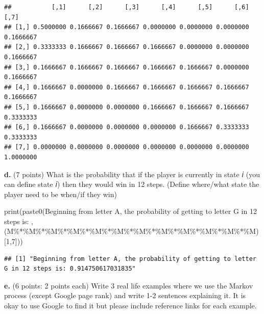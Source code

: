\documentclass[
]{article}
\newenvironment{Shaded}{\begin{snugshade}}{\end{snugshade}}
\newcommand{\DecValTok}[1]{\textcolor[rgb]{0.00,0.00,0.81}{#1}}
\newcommand{\FunctionTok}[1]{\textcolor[rgb]{0.00,0.00,0.00}{#1}}
\newcommand{\NormalTok}[1]{#1}
\newcommand{\SpecialCharTok}[1]{\textcolor[rgb]{0.00,0.00,0.00}{#1}}
\newcommand{\StringTok}[1]{\textcolor[rgb]{0.31,0.60,0.02}{#1}}
\begin{document}
\begin{verbatim}
##           [,1]      [,2]      [,3]      [,4]      [,5]      [,6]      [,7]
## [1,] 0.5000000 0.1666667 0.1666667 0.0000000 0.0000000 0.0000000 0.1666667
## [2,] 0.3333333 0.1666667 0.1666667 0.1666667 0.0000000 0.0000000 0.1666667
## [3,] 0.1666667 0.1666667 0.1666667 0.1666667 0.1666667 0.0000000 0.1666667
## [4,] 0.1666667 0.0000000 0.1666667 0.1666667 0.1666667 0.1666667 0.1666667
## [5,] 0.1666667 0.0000000 0.0000000 0.1666667 0.1666667 0.1666667 0.3333333
## [6,] 0.1666667 0.0000000 0.0000000 0.0000000 0.1666667 0.3333333 0.3333333
## [7,] 0.0000000 0.0000000 0.0000000 0.0000000 0.0000000 0.0000000 1.0000000
\end{verbatim}

\textbf{d.} (7 points) What is the probability that if the player is
currently in state 𝑖 (you can define state 𝑖) then they would win in 12
steps. (Define where/what state the player need to be when/if they win)

\begin{Shaded}
\begin{Highlighting}[]
\FunctionTok{print}\NormalTok{(}\FunctionTok{paste0}\NormalTok{(}\StringTok{\textquotesingle{}Beginning from letter A, the probability of getting to letter G in 12 steps is: \textquotesingle{}}\NormalTok{, (M}\SpecialCharTok{\%*\%}\NormalTok{M}\SpecialCharTok{\%*\%}\NormalTok{M}\SpecialCharTok{\%*\%}\NormalTok{M}\SpecialCharTok{\%*\%}\NormalTok{M}\SpecialCharTok{\%*\%}\NormalTok{M}\SpecialCharTok{\%*\%}\NormalTok{M}\SpecialCharTok{\%*\%}\NormalTok{M}\SpecialCharTok{\%*\%}\NormalTok{M}\SpecialCharTok{\%*\%}\NormalTok{M}\SpecialCharTok{\%*\%}\NormalTok{M}\SpecialCharTok{\%*\%}\NormalTok{M)[}\DecValTok{1}\NormalTok{,}\DecValTok{7}\NormalTok{]))}
\end{Highlighting}
\end{Shaded}

\begin{verbatim}
## [1] "Beginning from letter A, the probability of getting to letter G in 12 steps is: 0.914750617031835"
\end{verbatim}

\textbf{e.} (6 points: 2 points each) Write 3 real life examples where
we use the Markov process (except Google page rank) and write 1-2
sentences explaining it. It is okay to use Google to find it but please
include reference links for each example.
\end{document}
